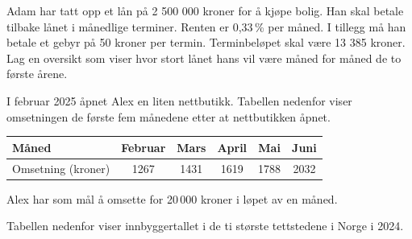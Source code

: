 Adam har tatt opp et lån på 2 500 000 kroner for å kjøpe bolig.
Han skal betale tilbake lånet i månedlige terminer.
Renten er 0,33\,\% per måned. I tillegg må han betale et gebyr på 50 kroner per termin.
Terminbeløpet skal være 13 385 kroner.
Lag en oversikt som viser hvor stort lånet hans vil være måned for måned de to
første årene.

I februar 2025 åpnet Alex en liten
nettbutikk. Tabellen nedenfor viser omsetningen de første fem månedene etter
at nettbutikken åpnet.
\begin{center}
	\small
	\begin{tabular}{|l|c|c|c|c|c|}
		\hline
		Måned & Februar & Mars & April & Mai & Juni \\
		\hline
		Omsetning (kroner) & 1267 & 1431 & 1619 & 1788 & 2032 \\
		\hline
	\end{tabular}
\end{center}


Alex har som mål å omsette for 20\,000 kroner i løpet av en måned.



\newpage
{}
Tabellen nedenfor viser innbyggertallet i de ti største tettstedene i Norge i 2024.

